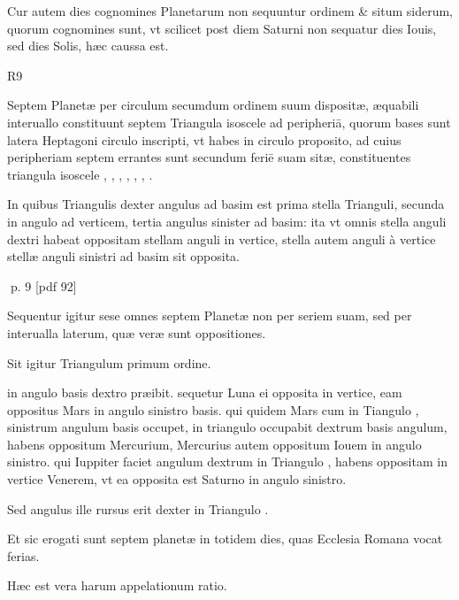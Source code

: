 \begin{parnumbers}
Cur autem dies cognomines Planetarum non sequuntur ordinem \& situm siderum, quorum cognomines sunt, vt scilicet post diem Saturni non sequatur dies Iouis, sed dies Solis, hæc caussa est.

\begin{wrapfigure}[9]{R}{9\baselineskip}
  \centering
  \def\svgwidth{9\baselineskip}
  {\astrofont}
\end{wrapfigure}

Septem Planetæ per circulum secumdum ordinem suum dispositæ, æquabili interuallo constituunt septem Triangula isoscele ad peripheriā,  quorum bases sunt latera Heptagoni circulo inscripti, vt habes in circulo proposito, ad cuius peripheriam septem errantes sunt secundum feriē suam sitæ, constituentes triangula isoscele , , , , , , .

In quibus Triangulis dexter angulus ad basim est prima stella Trianguli, secunda in angulo ad verticem, tertia angulus sinister ad basim: ita vt omnis stella anguli dextri habeat oppositam  stellam anguli in vertice, stella autem anguli à vertice stellæ anguli sinistri ad basim sit opposita.

\end{parnumbers}
\clearpage
p. 9 [pdf 92]

\begin{parnumbers}

Sequentur igitur sese omnes septem Planetæ non per seriem suam, sed per interualla laterum, quæ veræ sunt oppositiones.

Sit igitur Triangulum  primum ordine.

 in angulo basis dextro præibit. sequetur Luna ei opposita in vertice, eam oppositus Mars in angulo sinistro basis. qui quidem Mars cum in Tiangulo , sinistrum angulum basis occupet, in triangulo  occupabit dextrum basis angulum, habens oppositum Mercurium, Mercurius autem oppositum Iouem in angulo sinistro. qui Iuppiter faciet angulum dextrum in Triangulo , habens oppositam in vertice  Venerem, vt ea opposita est Saturno in angulo sinistro.

Sed angulus ille rursus erit dexter in Triangulo .

Et sic erogati sunt septem planetæ in totidem dies, quas Ecclesia Romana vocat ferias.

Hæc est vera harum appelationum ratio.

\end{parnumbers}

